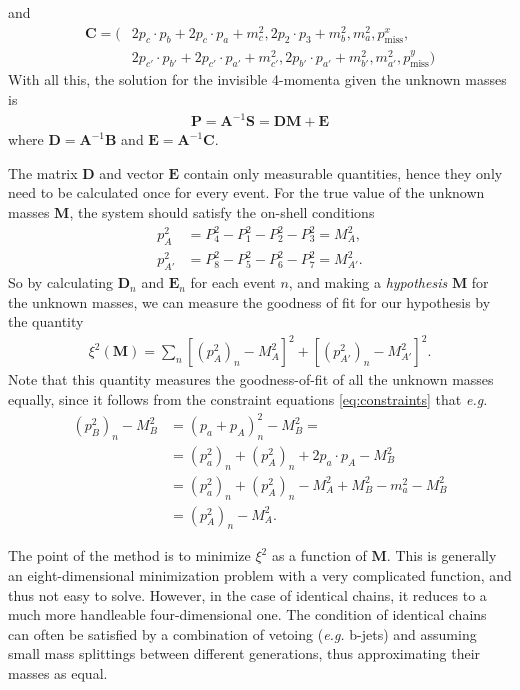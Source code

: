 \documentclass[twoside,english]{uiofysmaster}
\begin{document}
and
\begin{align}
	\mathbf{C} = ( &2p_c \cdot p_b + 2p_c \cdot p_a + m_c^2, 2 p_2 \cdot p_3 + m_b^2, m_a^2, p_\mathrm{miss}^x, \nonumber \\ 
				   &2p_{c'}\cdot p_{b'} + 2 p_{c'} \cdot p_{a'} + m_{c'}^2, 2 p_{b'} \cdot p_{a'} + m_{b'}^2, m_{a'}^2, p_\mathrm{miss}^y )
\end{align}
With all this, the solution for the invisible 4-momenta given the unknown masses is 
\begin{align}
	\mathbf{P} = \mathbf{A}^{-1} \mathbf{S} = \mathbf{D} \mathbf{M} + \mathbf{E}
\end{align}
where $\mathbf{D} = \mathbf{A}^{-1}\mathbf{B}$ and $\mathbf{E} = \mathbf{A}^{-1}\mathbf{C}$.

The matrix $\mathbf{D}$ and vector $\mathbf{E}$ contain only measurable quantities, hence they only need to be calculated once for every event. For the true value of the unknown masses $\mathbf{M}$, the system should satisfy the on-shell conditions
\begin{align}
	p_{A}^2 &= P_4^2 - P_1 ^2 - P_2^2 - P_3^2 = M_{A}^2, \nonumber\\
	p_{A'}^2 &= P_8^2 - P_5 ^2 - P_6^2 - P_7^2 = M_{A'}^2.
\end{align}
So by calculating $\mathbf{D}_n$ and $\mathbf{E}_n$ for each event $n$, and making a {\it hypothesis} $\mathbf{M}$ for the unknown masses, we can measure the goodness of fit for our hypothesis by the quantity
\begin{align}
	\xi^2(\mathbf{M}) = \sum_n \left[(p_{A}^2)_n - M_A^2\right]^2 + \left[(p_{A'}^2)_n - M_{A'}^2\right]^2. 
\end{align}
Note that this quantity measures the goodness-of-fit of all the unknown masses equally, since it follows from the constraint equations \eqref{eq:constraints} that {\it e.g.}
\begin{align}
	(p_B^2)_n - M_B^2 &= (p_a + p_A)_n^2 - M_B^2 = \nonumber\\
				  &= (p_a^2)_n + (p_A^2)_n + 2p_a\cdot p_A - M_B^2\nonumber\\
				  &= (p_a^2)_n + (p_A^2)_n - M_A^2 + M_B^2 - m_a^2 - M_B^2\\
				  &= (p_A^2)_n - M_A^2.\nonumber
\end{align}

The point of the method is to minimize $\xi^2$ as a function of $\mathbf{M}$. This is generally an eight-dimensional minimization problem with a very complicated function, and thus not easy to solve. However, in the case of identical chains, it reduces to a much more handleable four-dimensional one. The condition of identical chains can often be satisfied by a combination of vetoing ({\it e.g.} b-jets) and assuming small mass splittings between different generations, thus approximating their masses as equal. 
\end{document}
